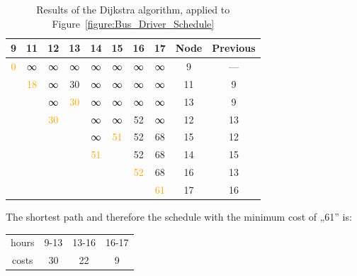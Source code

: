 \documentclass[a4paper, 12pt]{report}
\newcommand{\highlight}[1]{\textcolor{orange}{#1}}
\begin{document}
\begin{table}[htbp]
    \caption{Results of the Dijkstra algorithm, applied to
             Figure~\ref{figure:Bus_Driver_Schedule}}
    \begin{center}
        \begin{tabular}{cccccccc|cc}

            9 & 11 & 12 & 13 & 14 & 15 & 16 & 17 & Node & Previous\\
            \hline
            \highlight{0}
              & ∞  & ∞  & ∞  & ∞  & ∞  & ∞  & ∞  & 9    & — \\

              & \highlight{18}
                   & ∞  & 30 & ∞  & ∞  & ∞  & ∞  & 11   & 9 \\

              &    & ∞  & \highlight{30}
                             & ∞  & ∞  & ∞  & ∞  & 13   & 9 \\

              &    & \highlight{30}
                        &    & ∞  & ∞  & 52 & ∞  & 12   & 13 \\

              &    &    &    & ∞  & \highlight{51}
                                       & 52 & 68 & 15   & 12 \\

              &    &    &    & \highlight{51}
                                  &    & 52 & 68 & 14   & 15 \\

              &    &    &    &    &    & \highlight{52}
                                            & 68 & 16   & 13 \\

              &    &    &    &    &    &    & \highlight{61}
                                                 & 17   & 16 \\
        \end{tabular}
    \end{center}
    \label{table:Label}
\end{table}

The shortest path and therefore the schedule with the minimum cost of „61” is:

\begin{center}
    \begin{tabular}{c|ccc}
        hours & 9-13 & 13-16 & 16-17\\
        costs & 30     & 22  & 9\\
    \end{tabular}
\end{center}
\end{document}
